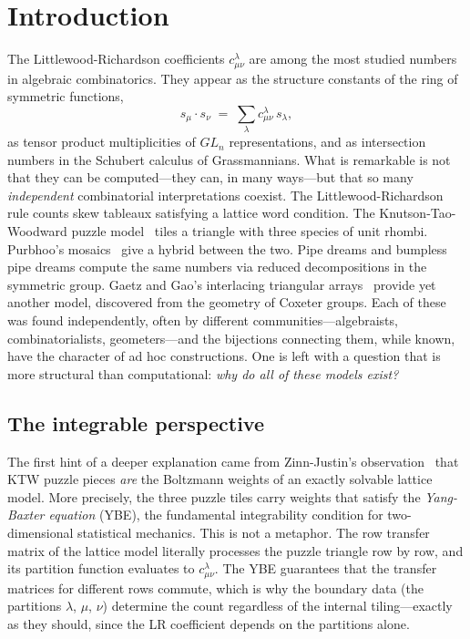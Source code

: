
\section{Introduction}\label{sec:introduction}

The Littlewood-Richardson coefficients $c^\lambda_{\mu\nu}$ are among the most
studied numbers in algebraic combinatorics.  They appear as the structure
constants of the ring of symmetric functions,
\begin{equation}\label{eq:lr-def}
  s_\mu \cdot s_\nu \;=\; \sum_\lambda c^\lambda_{\mu\nu}\, s_\lambda,
\end{equation}
as tensor product multiplicities of $GL_n$ representations, and as intersection
numbers in the Schubert calculus of Grassmannians.  What is remarkable is not
that they can be computed---they can, in many ways---but that so many
\emph{independent} combinatorial interpretations coexist.  The
Littlewood-Richardson rule counts skew tableaux satisfying a lattice word
condition.  The Knutson-Tao-Woodward puzzle model~\cite{knutson-tao-woodward-2004}
tiles a triangle with three species of unit rhombi.  Purbhoo's
mosaics~\cite{purbhoo-2007} give a hybrid between the two.  Pipe dreams and
bumpless pipe dreams compute the same numbers via reduced decompositions in the
symmetric group.  Gaetz and Gao's interlacing triangular
arrays~\cite{gaetz-gao-2024} provide yet another model, discovered from
the geometry of Coxeter groups.  Each of these was found independently, often
by different communities---algebraists, combinatorialists, geometers---and the
bijections connecting them, while known, have the character of ad hoc
constructions.  One is left with a question that is more structural than
computational: \emph{why do all of these models exist?}

\subsection*{The integrable perspective}

The first hint of a deeper explanation came from Zinn-Justin's
observation~\cite{zinn-justin-2008} that KTW puzzle pieces \emph{are} the
Boltzmann weights of an exactly solvable lattice model.  More precisely, the
three puzzle tiles carry weights that satisfy the \emph{Yang-Baxter equation}
(YBE), the fundamental integrability condition for two-dimensional statistical
mechanics.  This is not a metaphor.  The row transfer matrix of the lattice
model literally processes the puzzle triangle row by row, and its partition
function evaluates to $c^\lambda_{\mu\nu}$.  The YBE guarantees that the
transfer matrices for different rows commute, which is why the boundary data
(the partitions $\lambda$, $\mu$, $\nu$) determine the count regardless of the
internal tiling---exactly as they should, since the LR coefficient depends on
the partitions alone.

